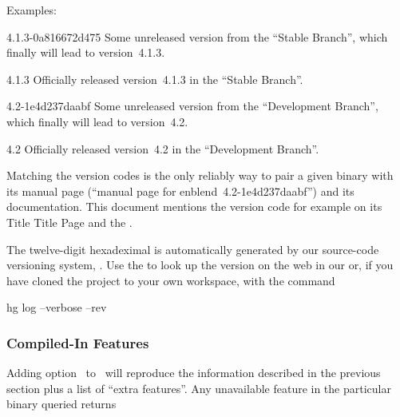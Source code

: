 \noindent Examples:

\begin{codelist}
\item[4.1.3-0a816672d475]\itemend
  Some unreleased version from the ``Stable Branch'', which finally will lead to version~4.1.3.

\item[4.1.3]\itemend
  Officially released version~4.1.3 in the ``Stable Branch''.

\item[4.2-1e4d237daabf]\itemend
  Some unreleased version from the ``Development Branch'', which finally will lead to
  version~4.2.

\item[4.2]\itemend
  Officially released version~4.2 in the ``Development Branch''.
\end{codelist}

Matching the version codes is the only reliably way to pair a given binary with its manual page
(``manual page for enblend~4.2-1e4d237daabf'') and its documentation.  This document mentions
the version code for example on its
\ifhevea
Title
\else
Title Page
\fi
and the .

%
%
%
The twelve-digit hexadeximal  is automatically generated by our source-code
versioning system, .  Use the
 to look up the version on the web in our  or, if you have cloned the project to your own workspace, with the
command
\begin{literal}
  hg log --verbose --rev 
\end{literal}


\subsubsection[Compiled-In Features]{\label{sec:compiled-in-features}%
  Compiled-In Features}

Adding option~ to~ will reproduce the information described
in the previous section plus a list of ``extra features''.  Any unavailable feature in the
particular binary queried returns


